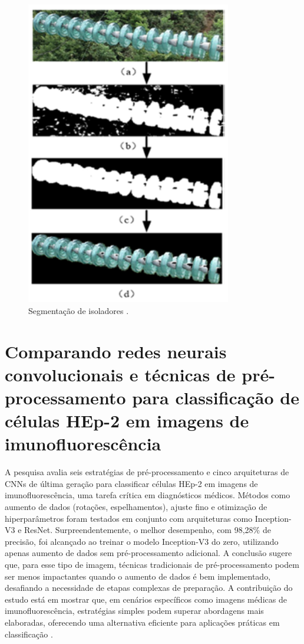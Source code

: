 \begin{figure}[H]
    \label{fig:segmentacao_zhang2022}
    \centering
    \caption{Segmentação de isoladores \cite{zhang2022}.}
    \includegraphics[width=0.8\textwidth]{img/trabalhos_relacionados/segmentacao_zhang2022.png}
\end{figure}

\section{Comparando redes neurais convolucionais e técnicas de pré- processamento para classificação de células HEp-2 em imagens de imunofluorescência}
A pesquisa avalia seis estratégias de pré-processamento e cinco arquiteturas de CNNs de última geração para classificar células HEp-2 em imagens de imunofluorescência, uma tarefa crítica em diagnósticos médicos. Métodos como aumento de dados (rotações, espelhamentos), ajuste fino e otimização de hiperparâmetros foram testados em conjunto com arquiteturas como Inception-V3 e ResNet. Surpreendentemente, o melhor desempenho, com 98,28\% de precisão, foi alcançado ao treinar o modelo Inception-V3 do zero, utilizando apenas aumento de dados sem pré-processamento adicional. A conclusão sugere que, para esse tipo de imagem, técnicas tradicionais de pré-processamento podem ser menos impactantes quando o aumento de dados é bem implementado, desafiando a necessidade de etapas complexas de preparação. A contribuição do estudo está em mostrar que, em cenários específicos como imagens médicas de imunofluorescência, estratégias simples podem superar abordagens mais elaboradas, oferecendo uma alternativa eficiente para aplicações práticas em classificação \cite{rodrigues2020comparing}.

